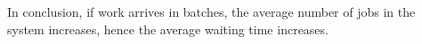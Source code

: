 \begin{exercise}
\begin{solution}
In conclusion, if work arrives in batches, the average number of jobs
in the system increases, hence the average waiting time increases.
  \end{solution}
\end{exercise}







